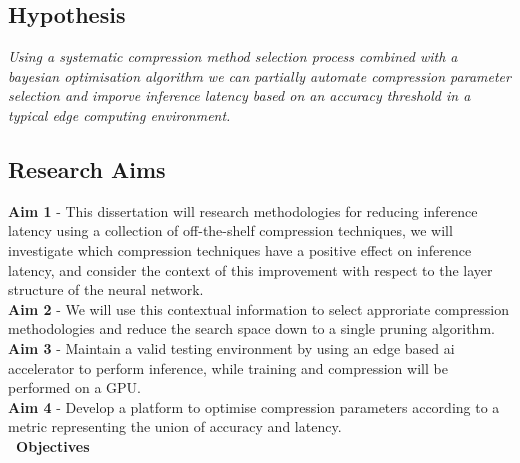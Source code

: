 \documentclass[../Dissertation.tex]{subfiles}
\begin{document}
\subsection{Hypothesis}
\emph{Using a systematic compression method selection process combined with a bayesian optimisation algorithm we can partially automate compression parameter selection and imporve inference latency based on an accuracy threshold in a typical edge computing environment.}

\subsection{Research Aims}
\textbf{Aim 1}\label{Aim1} - This dissertation will research methodologies for reducing inference latency using a collection of off-the-shelf compression techniques, we will investigate which compression techniques have a positive effect on inference latency, and consider the context of this improvement with respect to the layer structure of the neural network.\\ 
\noindent\textbf{Aim 2}\label{Aim2} - We will use this contextual information to select approriate compression methodologies and reduce the search space down to a single pruning algorithm.\\
\noindent\textbf{Aim 3}\label{Aim3} - Maintain a valid testing environment by using an edge based ai accelerator to perform inference, while training and compression will be performed on a GPU.\\
\noindent\textbf{Aim 4}\label{Aim4} - Develop a platform to optimise compression parameters according to a metric representing the union of accuracy and latency.\\
\textbf{\large~Objectives}
\end{document}

